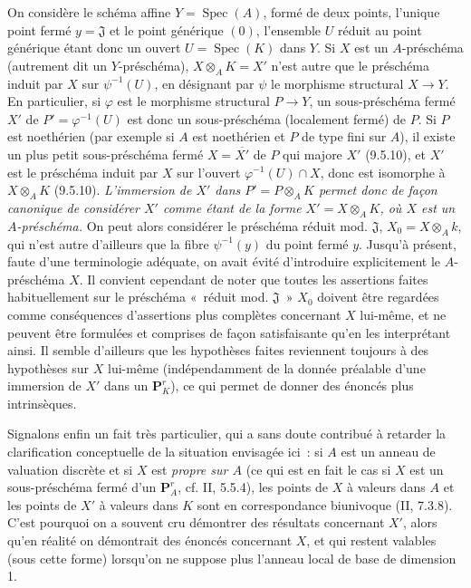 \begin{env}[3.7.2]
On considère le schéma affine $Y=\operatorname{Spec}(A)$, formé de deux
points, l'unique point
fermé $y=\mathfrak{J}$ et le point générique $(0)$, l'ensemble $U$ réduit au
point générique étant donc un ouvert $U=\operatorname{Spec}(K)$ dans $Y$. Si
$X$ est un $A$-préschéma (autrement dit un $Y$-préschéma),
$X\otimes_A K=X'$ n'est autre que le préschéma induit par $X$ sur
$\psi^{-1}(U)$, en désignant par $\psi$ le morphisme structural $X\to Y$. En
particulier, si $\varphi$ est le morphisme structural $P\to Y$, un
sous-préschéma fermé $X'$ de $P'=\varphi^{-1}(U)$ est donc un sous-préschéma
(localement fermé) de $P$. Si $P$ est noethérien (par exemple si $A$ est
noethérien et $P$ de type fini sur $A$), il existe un plus petit
sous-préschéma fermé $X=\overline{X'}$ de $P$ qui majore $X'$ (9.5.10), et
$X'$ est le préschéma induit par $X$ sur l'ouvert
$\varphi^{-1}(U)\cap X$, donc est isomorphe à $X\otimes_A K$ (9.5.10).
\emph{L'immersion de $X'$ dans $P'=P\otimes_A K$ permet donc de façon
canonique de considérer $X'$ comme étant de la forme $X'=X\otimes_A K$, où
$X$ est un $A$-préschéma.} On peut alors considérer le préschéma réduit mod.
$\mathfrak{J}$, $X_0=X\otimes_A k$, qui n'est autre d'ailleurs que la fibre
$\psi^{-1}(y)$ du point fermé $y$. Jusqu'à présent, faute d'une terminologie
adéquate, on avait évité d'introduire explicitement le $A$-préschéma $X$. Il
convient cependant de noter que toutes les assertions faites habituellement
sur le préschéma «~réduit mod. $\mathfrak{J}$~» $X_0$ doivent être regardées
comme conséquences d'assertions plus complètes concernant $X$ lui-même, et ne
peuvent être formulées et comprises de façon satisfaisante qu'en les
interprétant ainsi. Il semble d'ailleurs que les hypothèses faites reviennent
toujours à des hypothèses sur $X$ lui-même (indépendamment de la donnée
préalable d'une immersion de $X'$ dans un $\mathbf{P}_K^r$), ce qui permet de
donner des énoncés plus intrinsèques.
\end{env}

\begin{env}[3.7.3]
\label{I.3.7.3-fr}
Signalons enfin un fait très particulier, qui a sans doute contribué à
retarder la clarification conceptuelle de la situation envisagée ici~: si
$A$ est un anneau de valuation discrète et si $X$ est \emph{propre sur $A$}
(ce qui est en fait le cas si $X$ est un sous-préschéma fermé d'un
$\mathbf{P}_A^r$, cf. II, 5.5.4), les points de $X$ à valeurs dans $A$ et les
points de $X'$ à valeurs dans $K$ sont en correspondance biunivoque
(II, 7.3.8). C'est pourquoi on a souvent cru démontrer des résultats
concernant $X'$, alors qu'en réalité on démontrait des énoncés concernant
$X$, et qui restent valables (sous cette forme) lorsqu'on ne suppose plus
l'anneau local de base de dimension 1.
\end{env}

